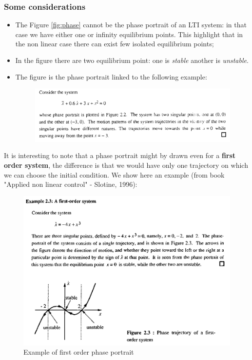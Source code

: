 \subsubsection{Some considerations}
\begin{itemize}
    \item The Figure \ref{fig:phase} cannot be the phase portrait of an LTI system: in that case we have either one or infinity equilibrium points. This highlight that in the non linear case there can exist few isolated equilibrium points;
    \item In the figure there are two equilibrium point: one is \textit{stable} another is \textit{unstable}.
    \item The figure is the phase portrait linked to the following example:
    \begin{figure}[h]
        \centering
        \includegraphics[scale=0.8]{NonLinearControl/images/Slotine1.png}
        \label{fig:enter-label}
    \end{figure}
\end{itemize}

\noindent
It is interesting to note that a phase portrait might by drawn even for a \textbf{first order system}, the difference is that we would have only one trajectory on which we can choose the initial condition. We show here an example (from book "Applied non linear control" - Slotine, 1996): 
\begin{figure}[h]
    \centering
    \includegraphics[scale=0.8]{NonLinearControl/images/ExFirstOrder.png}
    \caption{Example of first order phase portrait}
    \label{fig:enter-label}
\end{figure}


